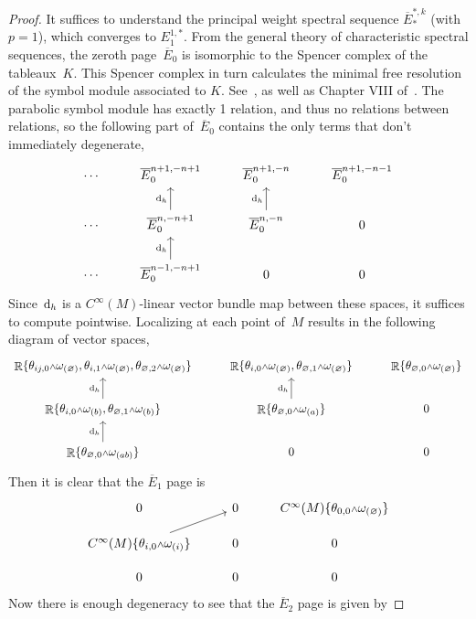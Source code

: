 \documentclass[10pt,a4paper]{amsart}
\DeclareMathOperator{\R}{\mathbb{R}}
\renewcommand{\d}{{\rm d}}
\newcommand{\w}{{\mathchoice{\,{\scriptstyle\wedge}\,}{{\scriptstyle\wedge}}
 {{\scriptscriptstyle\wedge}}{{\scriptscriptstyle\wedge}}}}
\newcommand{\thetas}[1]{\theta_{#1}}
\newcommand{\omegas}[1]{\omega_{(#1)}}
\renewcommand{\dh}{\ensuremath{\hspace{1pt} \d_h}}
\newcommand{\cMinfty}{C^\infty(M)}
\numberwithin{equation}{section}
\begin{document}
\begin{proof}It suffices to understand the principal weight spectral sequence $\overline{E}_*^{*,k}$ (with $p =1$), which converges to $E_1^{1,*}$.
 From the general theory of characteristic spectral sequences, the zeroth page~$\overline{E}_0$ is isomorphic to the Spencer complex of the tableaux~$K$. This Spencer complex in turn calculates the minimal free resolution of the symbol module associated to $K$. See~\cite{Characteristic_Cohomology_I}, as well as Chapter VIII of~\cite{BCGGG}. The parabolic symbol module has exactly 1 relation, and thus no relations between relations, so the following part of~$\overline{E}_0$ contains the only terms that don't immediately degenerate,
 \[
 \begin{tikzcd}
 \cdots & \overline{E}_0^{n+1,-n+1} & \overline{E}_0^{n+1,-n} & \overline{E}_0^{n+1,-n-1} \\
 \cdots & \overline{E}_0^{n,-n+1} \ar[u, "\dh"] & \overline{E}_0^{n,-n} \ar[u, "\dh"] & 0 \\
 \cdots & \overline{E}_0^{n-1,-n+1} \ar[u, "\dh"] & 0 & 0
 \end{tikzcd}
 \]
Since $\dh$ is a $\cMinfty$-linear vector bundle map between these spaces, it suffices to compute pointwise. Localizing at each point of~$M$ results in the following diagram of vector spaces,
\[
\begin{tikzcd}
\R\{\thetas{ij,0}\w\omegas{\varnothing},\thetas{i,1}\w\omegas{\varnothing},\thetas{\varnothing,2}\w\omegas{\varnothing}\} & \R\{\thetas{i,0}\w\omegas{\varnothing},\thetas{\varnothing,1}\w\omegas{\varnothing}\} & \R\{\thetas{\varnothing,0}\w\omegas{\varnothing}\} \\
\R\{\thetas{i,0}\w\omegas{b},\thetas{\varnothing,1}\w\omegas{b}\} \ar[u, "\dh"] & \R\{\thetas{\varnothing,0}\w\omegas{a}\}\ar[u, "\dh"] & 0 \\
\R\{\thetas{\varnothing,0}\w\omegas{ab}\} \ar[u, "\dh"] & 0 & 0
\end{tikzcd}
\]
Then it is clear that the $\overline{E}_1$ page is
\begin{equation}\label{eq:E_1-bar page spectral sequence}
 \begin{tikzcd}
 0 & 0 & \cMinfty\{\thetas{0,0}\w\omegas{\varnothing}\} \\[-2ex]
 \cMinfty\{\thetas{i,0}\w\omegas{i}\} \ar[ur] & 0 & 0 \\[-2ex]
 0 & 0 & 0
 \end{tikzcd}
\end{equation}
Now there is enough degeneracy to see that the $\overline{E}_2$ page is given by

\end{proof}
\end{document}
